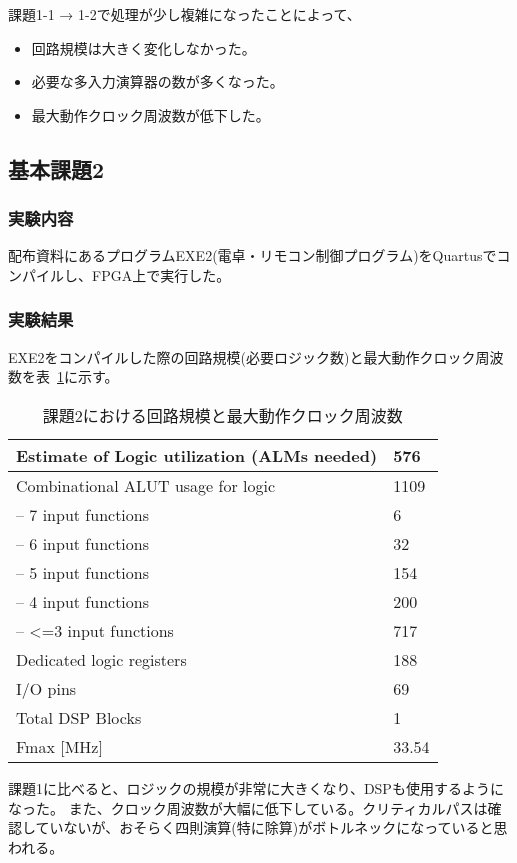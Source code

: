 課題1-1 → 1-2で処理が少し複雑になったことによって、
\begin{itemize}
    \item 回路規模は大きく変化しなかった。
    \item 必要な多入力演算器の数が多くなった。
    \item 最大動作クロック周波数が低下した。
\end{itemize}

\subsection{基本課題2}
\subsubsection{実験内容}
配布資料にあるプログラムEXE2(電卓・リモコン制御プログラム)をQuartusでコンパイルし、FPGA上で実行した。
\subsubsection{実験結果}
EXE2をコンパイルした際の回路規模(必要ロジック数)と最大動作クロック周波数を表~\ref{tab:basic2}に示す。
\begin{table}[h]
    \caption{課題2における回路規模と最大動作クロック周波数}\label{tab:basic2}
    \begin{center}
    \begin{tabular}{|l|l|}
    \hline
    Estimate of Logic utilization (ALMs needed) & 576  \\\hline
    Combinational ALUT usage for logic          & 1109 \\\hline
    -- 7 input functions                        & 6    \\\hline
    -- 6 input functions                        & 32   \\\hline
    -- 5 input functions                        & 154  \\\hline
    -- 4 input functions                        & 200  \\\hline
    -- \textless{}=3 input functions            & 717  \\\hline
    Dedicated logic registers                   & 188  \\\hline
    I/O pins                                    & 69   \\\hline
    Total DSP Blocks                            & 1   \\\hline
    Fmax [MHz]                                  & 33.54 \\\hline
    \end{tabular}
    \end{center}
\end{table}
課題1に比べると、ロジックの規模が非常に大きくなり、DSPも使用するようになった。
また、クロック周波数が大幅に低下している。クリティカルパスは確認していないが、おそらく四則演算(特に除算)がボトルネックになっていると思われる。
